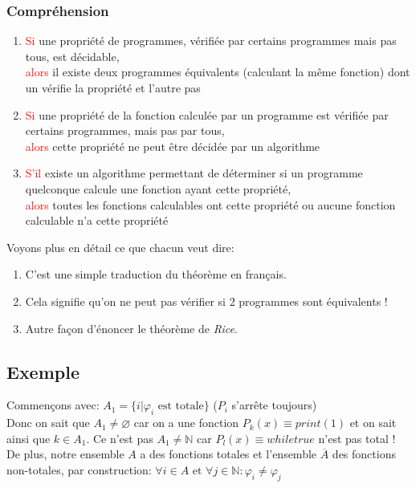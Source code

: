 \documentclass{report}
\begin{document}
\subsubsection{Compréhension}
\begin{enumerate}
\item \textcolor{red}{Si} une propriété de programmes, vérifiée par certains programmes mais pas tous, est décidable, \\
\textcolor{red}{alors} il existe deux programmes équivalents (calculant la même fonction) dont un vérifie la propriété et l'autre pas
\item \textcolor{red}{Si} une propriété de la fonction calculée par un programme est vérifiée par certains programmes, mais pas par tous, \\
\textcolor{red}{alors} cette propriété ne peut être décidée par un algorithme
\item \textcolor{red}{S'il} existe un algorithme permettant de déterminer si un programme quelconque calcule une fonction ayant cette propriété, \\
\textcolor{red}{alors} toutes les fonctions calculables ont cette propriété ou aucune fonction
calculable n’a cette propriété
\end{enumerate}
Voyons plus en détail ce que chacun veut dire:
\begin{enumerate}
\item C'est une simple traduction du théorème en français.
\item Cela signifie qu'on ne peut pas vérifier si 2 programmes sont équivalents !
\item Autre façon d'énoncer le théorème de \textit{Rice}.
\end{enumerate}

\subsection{Exemple}
Commençons avec: $ A_1 = \{i | \varphi_i \text{ est totale}\}$ ($P_i$ s'arrête toujours)\\
Donc on sait que $A_1 \neq \varnothing$ car on a une fonction $P_k(x) \equiv print(1)$ et on sait ainsi que $k \in A_1$. Ce n'est pas $A_1 \neq \mathbb{N}$ car $P_l(x) \equiv while true$ n'est pas total ! De plus, notre ensemble $A$ a des fonctions totales et l'ensemble $\overline{A}$ des fonctions non-totales, par construction: $\forall i \in A \text{ et } \forall j \in \mathbb{N}: \varphi_i \neq \varphi_j$\\
\end{document}
